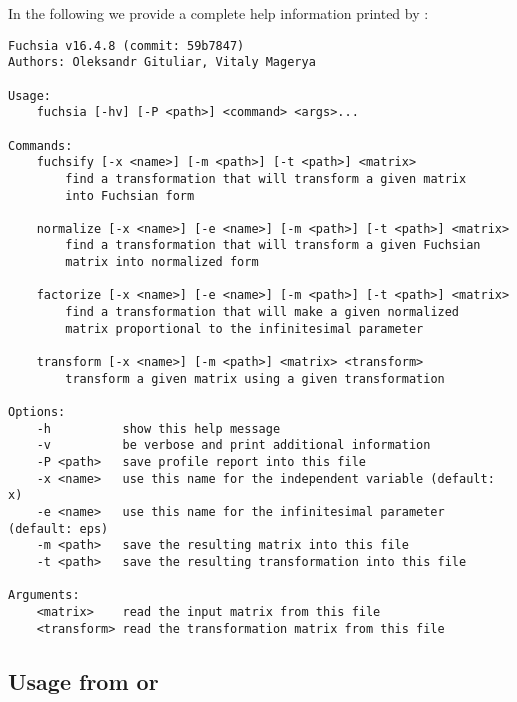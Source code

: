 \documentclass[12pt,a4paper]{article}
\begin{document}
In the following we provide a complete help information printed by :
{\small
\begin{verbatim}
Fuchsia v16.4.8 (commit: 59b7847)
Authors: Oleksandr Gituliar, Vitaly Magerya
        
Usage:
    fuchsia [-hv] [-P <path>] <command> <args>...

Commands:
    fuchsify [-x <name>] [-m <path>] [-t <path>] <matrix>
        find a transformation that will transform a given matrix
        into Fuchsian form

    normalize [-x <name>] [-e <name>] [-m <path>] [-t <path>] <matrix>
        find a transformation that will transform a given Fuchsian
        matrix into normalized form

    factorize [-x <name>] [-e <name>] [-m <path>] [-t <path>] <matrix>
        find a transformation that will make a given normalized
        matrix proportional to the infinitesimal parameter

    transform [-x <name>] [-m <path>] <matrix> <transform>
        transform a given matrix using a given transformation

Options:
    -h          show this help message
    -v          be verbose and print additional information
    -P <path>   save profile report into this file
    -x <name>   use this name for the independent variable (default: x)
    -e <name>   use this name for the infinitesimal parameter (default: eps)
    -m <path>   save the resulting matrix into this file
    -t <path>   save the resulting transformation into this file

Arguments:
    <matrix>    read the input matrix from this file
    <transform> read the transformation matrix from this file
\end{verbatim}}


\subsection{Usage from \sage or \python}
\end{document}
